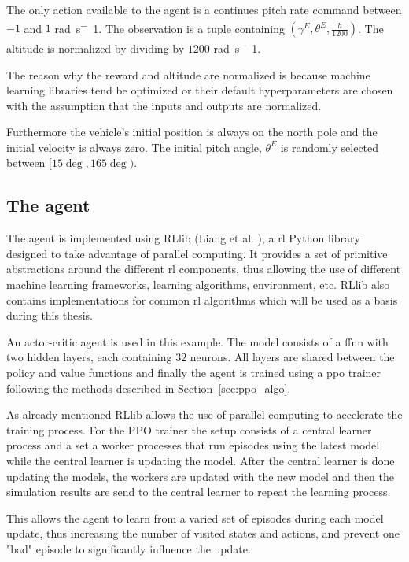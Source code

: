 The only action available to the agent is a continues pitch rate command between $-1$ and $1$ \si{rad.s^-1}. The observation is a tuple containing $\left(\gamma^E, \theta^E, \frac{h}{1200} \right)$. The altitude is normalized by dividing by $1200$ \si{rad.s^-1}.

The reason why the reward and altitude are normalized is because machine learning libraries tend be optimized or their default hyperparameters are chosen with the assumption that the inputs and outputs are normalized.

Furthermore the vehicle's initial position is always on the north pole and the initial velocity is always zero. The initial pitch angle, $\theta^E$ is randomly selected between $[15\deg,165\deg)$.

\subsection{The agent}
The agent is implemented using RLlib (Liang et al. \cite{liang2017rllib}), a \acrlong{rl} Python library designed to take advantage of parallel computing. It provides a set of primitive abstractions around the different \acrshort{rl} components, thus allowing the use of different machine learning frameworks, learning algorithms, environment, etc. RLlib also contains implementations for common \acrshort{rl} algorithms which will be used as a basis during this thesis.

An actor-critic agent is used in this example. The model consists of a \acrfull{ffnn} with two hidden layers, each containing $32$ neurons. All layers are shared between the policy and value functions and finally the agent is trained using a \acrshort{ppo} trainer following the methods described in Section~\ref{sec:ppo_algo}.

As already mentioned RLlib allows the use of parallel computing to accelerate the training process. For the PPO trainer the setup consists of a central learner process and a set a worker processes that run episodes using the latest model while the central learner is updating the model. After the central learner is done updating the models, the workers are updated with the new model and then the simulation results are send to the central learner to repeat the learning process. 

This allows the agent to learn from a varied set of episodes during each model update, thus increasing the number of visited states and actions, and prevent one "bad" episode to significantly influence the update.

